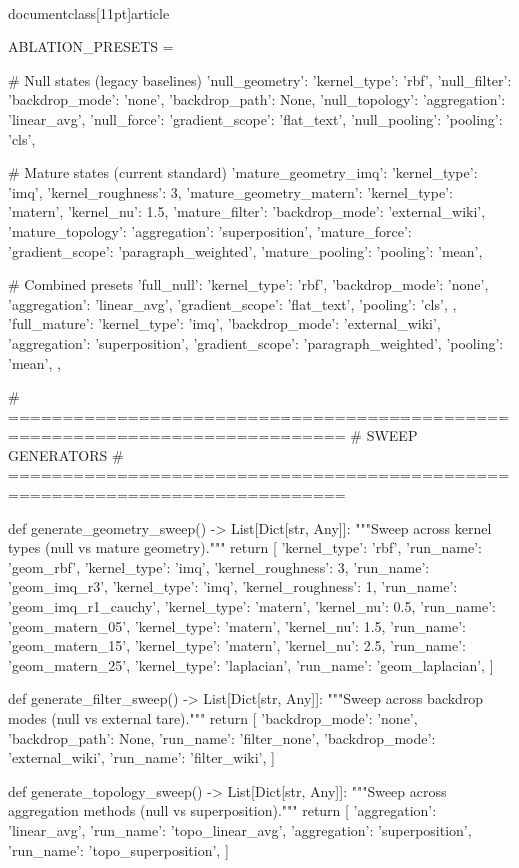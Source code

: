 \\documentclass[11pt]{article}
\begin{document}
\begin{CodeBlock}
ABLATION_PRESETS = {
    # Null states (legacy baselines)
    'null_geometry': {'kernel_type': 'rbf'},
    'null_filter': {'backdrop_mode': 'none', 'backdrop_path': None},
    'null_topology': {'aggregation': 'linear_avg'},
    'null_force': {'gradient_scope': 'flat_text'},
    'null_pooling': {'pooling': 'cls'},

    # Mature states (current standard)
    'mature_geometry_imq': {'kernel_type': 'imq', 'kernel_roughness': 3},
    'mature_geometry_matern': {'kernel_type': 'matern', 'kernel_nu': 1.5},
    'mature_filter': {'backdrop_mode': 'external_wiki'},
    'mature_topology': {'aggregation': 'superposition'},
    'mature_force': {'gradient_scope': 'paragraph_weighted'},
    'mature_pooling': {'pooling': 'mean'},

    # Combined presets
    'full_null': {
        'kernel_type': 'rbf',
        'backdrop_mode': 'none',
        'aggregation': 'linear_avg',
        'gradient_scope': 'flat_text',
        'pooling': 'cls',
    },
    'full_mature': {
        'kernel_type': 'imq',
        'backdrop_mode': 'external_wiki',
        'aggregation': 'superposition',
        'gradient_scope': 'paragraph_weighted',
        'pooling': 'mean',
    },
}


# =============================================================================
# SWEEP GENERATORS
# =============================================================================

def generate_geometry_sweep() -> List[Dict[str, Any]]:
    """Sweep across kernel types (null vs mature geometry)."""
    return [
        {'kernel_type': 'rbf', 'run_name': 'geom_rbf'},
        {'kernel_type': 'imq', 'kernel_roughness': 3, 'run_name': 'geom_imq_r3'},
        {'kernel_type': 'imq', 'kernel_roughness': 1, 'run_name': 'geom_imq_r1_cauchy'},
        {'kernel_type': 'matern', 'kernel_nu': 0.5, 'run_name': 'geom_matern_05'},
        {'kernel_type': 'matern', 'kernel_nu': 1.5, 'run_name': 'geom_matern_15'},
        {'kernel_type': 'matern', 'kernel_nu': 2.5, 'run_name': 'geom_matern_25'},
        {'kernel_type': 'laplacian', 'run_name': 'geom_laplacian'},
    ]


def generate_filter_sweep() -> List[Dict[str, Any]]:
    """Sweep across backdrop modes (null vs external tare)."""
    return [
        {'backdrop_mode': 'none', 'backdrop_path': None, 'run_name': 'filter_none'},
        {'backdrop_mode': 'external_wiki', 'run_name': 'filter_wiki'},
    ]


def generate_topology_sweep() -> List[Dict[str, Any]]:
    """Sweep across aggregation methods (null vs superposition)."""
    return [
        {'aggregation': 'linear_avg', 'run_name': 'topo_linear_avg'},
        {'aggregation': 'superposition', 'run_name': 'topo_superposition'},
    ]



\end{CodeBlock}
\end{document}
